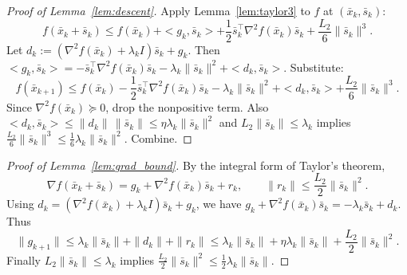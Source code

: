 \documentclass[10pt,twocolumn,letterpaper]{article}
\def\ip#1#2{<#1,#2>}%
\theoremstyle{compact}
\theoremstyle{compactremark}
\newcommand{\ip}[2]{\left\langle #1,#2\right\rangle}
\begin{document}
\begin{proof}[Proof of Lemma~\ref{lem:descent}]
Apply Lemma~\ref{lem:taylor3} to $f$ at $(\bar x_k,\bar s_k)$:
\[
f(\bar x_k+\bar s_k)\le f(\bar x_k)+\ip{g_k}{\bar s_k}+\frac12\bar s_k^\top\nabla^2 f(\bar x_k)\bar s_k+\frac{L_2}{6}\|\bar s_k\|^3.
\]
Let $d_k:=(\nabla^2 f(\bar x_k)+\lambda_k I)\bar s_k+g_k$.
Then $\ip{g_k}{\bar s_k}=-\bar s_k^\top\nabla^2 f(\bar x_k)\bar s_k-\lambda_k\|\bar s_k\|^2+\ip{d_k}{\bar s_k}$.
Substitute:
\[
f(\bar x_{k+1})\le f(\bar x_k)-\frac12\bar s_k^\top\nabla^2 f(\bar x_k)\bar s_k-\lambda_k\|\bar s_k\|^2+\ip{d_k}{\bar s_k}+\frac{L_2}{6}\|\bar s_k\|^3.
\]
Since $\nabla^2 f(\bar x_k)\succeq 0$, drop the nonpositive term. Also
$\ip{d_k}{\bar s_k}\le \|d_k\|\,\|\bar s_k\|\le \eta\lambda_k\|\bar s_k\|^2$
and $L_2\|\bar s_k\|\le \lambda_k$ implies $\frac{L_2}{6}\|\bar s_k\|^3\le \frac16\lambda_k\|\bar s_k\|^2$.
Combine.
\end{proof}

\begin{proof}[Proof of Lemma~\ref{lem:grad_bound}]
By the integral form of Taylor's theorem,
\[
\nabla f(\bar x_k+\bar s_k)=g_k+\nabla^2 f(\bar x_k)\bar s_k+r_k,
\qquad \|r_k\|\le \frac{L_2}{2}\|\bar s_k\|^2.
\]
Using $d_k=(\nabla^2 f(\bar x_k)+\lambda_k I)\bar s_k+g_k$, we have
$g_k+\nabla^2 f(\bar x_k)\bar s_k=-\lambda_k\bar s_k+d_k$.
Thus
\[
\|g_{k+1}\|\le \lambda_k\|\bar s_k\|+\|d_k\|+\|r_k\|
\le \lambda_k\|\bar s_k\|+\eta\lambda_k\|\bar s_k\|+\frac{L_2}{2}\|\bar s_k\|^2.
\]
Finally $L_2\|\bar s_k\|\le \lambda_k$ implies $\frac{L_2}{2}\|\bar s_k\|^2\le \frac12\lambda_k\|\bar s_k\|$.
\end{proof}
\end{document}
